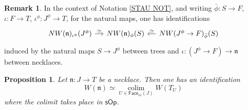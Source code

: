 \documentclass[a4paper,10pt
,draft
]{article}%
\numberwithin{equation}{section}
\numberwithin{figure}{section}
\newtheorem{proposition}[equation]{Proposition}%
\theoremstyle{definition} %
\newtheorem{remark}[equation]{Remark}%
\DeclareMathOperator{\colim}{colim}%
\newcommand{\1}{\ensuremath{\mathbbm 1}}%
\begin{document}
\begin{remark}\label{STAU REM}
	In the context of Notation \ref{STAU NOT},
	and writing 
	$\bar{\phi} \colon S \to F$,
	$\iota \colon F \to T$,
	$\iota^{\phi} \colon J^{\phi} \to T$,
	for the natural maps,
	one has identifications
	\begin{equation}
	\begin{tikzcd}[column sep = 12pt]
	NW(\mathfrak{n})_{\iota^{\phi}}(J^{\phi}) 
	\ar{r}{\simeq}
	&
	NW(\mathfrak{n})_{\phi}(S)
	&
	NW(J^{\phi} \to F)_{\bar{\phi}}(S)
	\ar{l}[swap]{\simeq}
	\end{tikzcd}
	\end{equation}
	induced by the natural maps
	$S \to J^{\phi}$ between trees and 
	$\iota \colon (J^{\phi} \to F) \to \mathfrak{n}$
	between necklaces.
\end{remark}




\begin{proposition}\label{NECKCOL PROP}
	Let $\mathfrak{n} \colon J \to T$ be a necklace.
	Then one has an identification
	\begin{equation}\label{NECKCOL EQ}
	W(\mathfrak{n})
	\simeq 
	\underset{U \in \mathsf{Face}_{sc}(J)}{\colim}
	W(T_U)
	\end{equation}
	where the colimit takes place 
	in $\mathsf{sOp}$.
\end{proposition}
\end{document}
